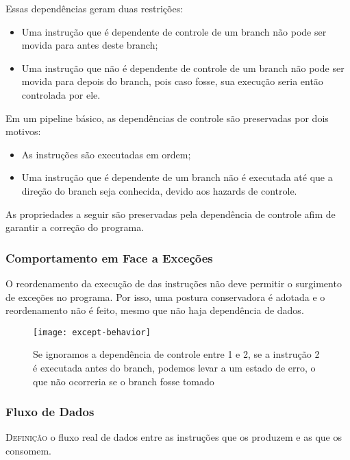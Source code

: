 Essas dependências geram duas restrições:
\begin{itemize}
  \item Uma instrução que é dependente de controle de um branch não pode ser movida para antes deste branch;

  \item Uma instrução que não é dependente de controle de um branch não pode ser movida para depois do branch, pois caso fosse, sua execução seria então controlada por ele.
\end{itemize}

Em um pipeline básico, as dependências de controle são preservadas por dois motivos:
\begin{itemize}
  \item As instruções são executadas em ordem;

  \item Uma instrução que é dependente de um branch não é executada até que a direção do branch seja conhecida, devido aos hazards de controle.
\end{itemize}

As propriedades a seguir são preservadas pela dependência de controle afim de garantir a correção do programa.



\subsubsection{Comportamento em Face a Exceções}
O reordenamento da execução de das instruções não deve permitir o surgimento de exceções no programa. Por isso, uma postura conservadora é adotada e o reordenamento não é feito, mesmo que não haja dependência de dados.

\begin{figure}[ht]
  \centering
  \texttt{[image: except-behavior]}
  \caption{Se ignoramos a dependência de controle entre 1 e 2, se a instrução 2 é executada antes do branch, podemos levar a um estado de erro, o que não ocorreria se o branch fosse tomado}
  \label{fig:except-behavior}
\end{figure}



\subsubsection{Fluxo de Dados}
\textsc{Definição} o fluxo real de dados entre as instruções que os produzem e as que os consomem.

